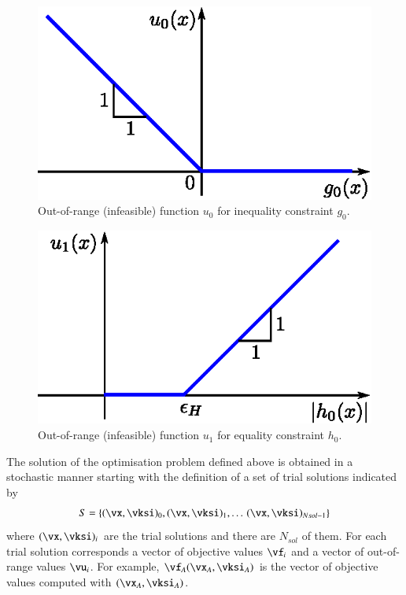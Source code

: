 \documentclass[final,5p,times,twocolumn]{elsarticle}
\begin{document}
\begin{figure} \centering
\includegraphics[scale=0.64]{./figs/gfcn.eps}
\caption{Out-of-range (infeasible) function $u_0$ for inequality constraint $g_0$.}
\label{fig:OORg}
\end{figure}

\begin{figure} \centering
\includegraphics[scale=0.64]{./figs/hfcn.eps}
\caption{Out-of-range (infeasible) function $u_1$ for equality constraint $h_0$.}
\label{fig:OORh}
\end{figure}

The solution of the optimisation problem defined above is obtained in a stochastic manner starting
with the definition of a set of trial solutions indicated by
\begin{equation}
    S = \{(\vx,\vksi)_0, (\vx,\vksi)_1, \ldots\, (\vx,\vksi)_{Nsol-1}\}
\end{equation}
where $(\vx,\vksi)_i$ are the trial solutions and there are $N_{sol}$ of them. For each trial
solution corresponds a vector of objective values $\vf_i$ and a vector of out-of-range values
$\vu_i$. For example, $\vf_A(\vx_A,\vksi_A)$ is the vector of objective values computed with
$(\vx_A,\vksi_A)$.
\end{document}
